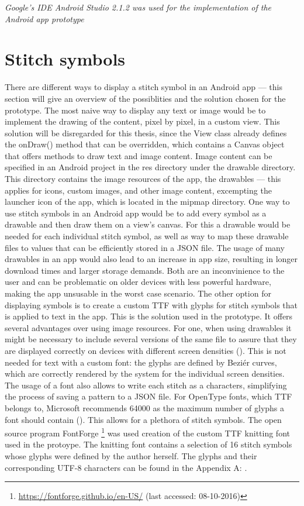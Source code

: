 \textit{Google’s IDE Android Studio 2.1.2 was used for the implementation of the Android app prototype}

\section{Stitch symbols}
There are different ways to display a stitch symbol in an Android app --- this section will give an overview of the possiblities and the solution chosen for the prototype. 
The most naive way to display any text or image would be to implement the drawing of the content, pixel by pixel, in a custom view. This solution will be disregarded for this thesis, since the View class already defines the onDraw() method that can be overridden, which contains a Canvas object that offers methods to draw text and image content. Image content can be specified in an Android project in the res directory under the drawable directory. This directory contains the image resources of the app, the drawables --- this applies for icons, custom images, and other image content, excempting the launcher icon of the app, which is located in the mipmap directory. One way to use stitch symbols in an Android app would be to add every symbol as a drawable and then draw them on a view's canvas. For this a drawable would be needed for each individual stitch symbol, as well as way to map these drawable files to values that can be efficiently stored in a \gls{JSON} file. The usage of many drawables in an app would also lead to an increase in app size, resulting in longer download times and larger storage demands. Both are an inconvinience to the user and can be problematic on older devices with less powerful hardware, making the app unsusable in the worst case scenario.
The other option for displaying symbols is to create a custom \gls{TTF} with glyphs for stitch symbols that is applied to text in the app. This is the solution used in the prototype. It offers several advantages over using image resources. For one, when using drawables it might be necessary to include several versions of the same file to assure that they are displayed correctly on devices with different screen densities (\cite{android_densities}). This is not needed for text with a custom font: the glyphs are defined by Beziér curves, which are correctly rendered by the system for the individual screen densities.  The usage of a font also allows to write each stitch as a characters, simplifying the process of saving a pattern to a \gls{JSON} file. For OpenType fonts, which \gls{TTF} belongs to, Microsoft recommends 64000 as the maximum number of glyphs a font should contain (\cite{microsoft_max_glyphs}). This allows for a plethora of stitch symbols. The open source program FontForge \footnote{\url{https://fontforge.github.io/en-US/} (last accessed: 08-10-2016)} was used creation of the custom \gls{TTF} knitting font used in the protoype. The knitting font contains a selection of 16 stitch symbols whose glyphs were defined by the author herself. The glyphs and their corresponding UTF-8 characters can be found in the Appendix A: .

